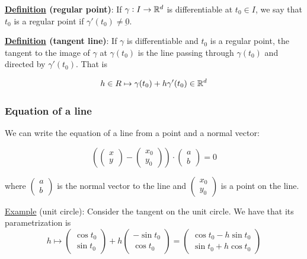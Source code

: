 \documentclass[10pt]{extarticle}
\renewcommand{\vec}[1]{\underbar{\ensuremath{#1}}}
\begin{document}
\textbf{\underline{Definition} (regular point)}:
If $\gamma: I \to \mathbb{R}^d$ is differentiable at $t_0 \in I$, we say that $t_0$ is a regular point if $\gamma'(t_0) \neq \vec{0}$.

\textbf{\underline{Definition} (tangent line)}:
If $\gamma$ is differentiable and $t_0$ is a regular point, the tangent to the image of $\gamma$ at $\gamma(t_0)$ is the line passing through $\gamma(t_0)$ and directed by $\gamma'(t_0)$.
That is

$$
    h \in R \mapsto \gamma(t_0) + h \gamma'(t_0) \in \mathbb{R}^d
$$

\subsubsection{Equation of a line}

We can write the equation of a line from a point and a normal vector:

$$
    \left(
    \begin{pmatrix}
            x \\ y
        \end{pmatrix} - \begin{pmatrix}
            x_0 \\ y_0
        \end{pmatrix}
    \right) \cdot \begin{pmatrix}
        a \\ b
    \end{pmatrix} = 0
$$

where $\begin{pmatrix}
        a \\ b
    \end{pmatrix}$ is the normal vector to the line and $\begin{pmatrix}
        x_0 \\ y_0
    \end{pmatrix}$ is a point on the line.


\underline{Example} (unit circle):
Consider the tangent on the unit circle. We have that its parametrization is
$$
    h \mapsto \begin{pmatrix}
        \cos t_0 \\ \sin t_0
    \end{pmatrix} + h \begin{pmatrix}
        -\sin t_0 \\ \cos t_0
    \end{pmatrix} =
    \begin{pmatrix}
        \cos t_0 - h \sin t_0 \\
        \sin t_0 + h \cos t_0
    \end{pmatrix}
$$
\end{document}
